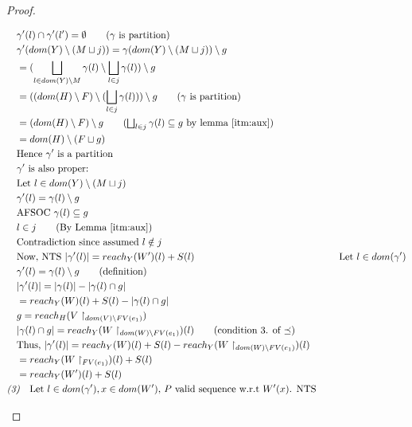 \documentclass[11pt]{article}
\theoremstyle{definition}
\begin{document}
\begin{proof}
\begin{description}
\begin{align*}
		&\quad \gamma'(l) \cap \gamma'(l') = \emptyset \tag{$\gamma$ is partition}\\
		&\quad \gamma'(dom(Y) \setminus (M \sqcup j)) = \gamma(dom(Y) \setminus (M \sqcup j)) \setminus g\\
		&\quad = (\bigsqcup_{l \in dom(Y) \setminus M} \gamma(l) \setminus \bigsqcup_{l \in j} \gamma(l)) 
			\setminus g\\
		&\quad = ((dom(H) \setminus F) \setminus (\bigsqcup_{l \in j} \gamma(l))) \setminus g 
			\tag{$\gamma$ is partition}\\
		&\quad = (dom(H) \setminus F) \setminus g 
			\tag{$\bigsqcup_{l \in j} \gamma(l) \subseteq g$ by lemma \ref{itm:aux}}\\
		&\quad = dom(H) \setminus (F \sqcup g)\\
		&\quad \text{Hence } \gamma' \text{ is a partition}\\
		&\quad \gamma' \text{ is also proper: }\\
		&\quad \text{Let } l \in dom(Y) \setminus (M \sqcup j)\\
		&\quad \gamma'(l) = \gamma(l) \setminus g\\
		&\quad \text{AFSOC } \gamma(l) \subseteq g\\ 
		&\quad l \in j \tag{By Lemma \ref{itm:aux}}\\
		&\quad \text{Contradiction since assumed } l \notin j\\ 
		&\quad \text{Now, NTS } |\gamma'(l)| = reach_{Y}(W')(l) + S(l)
		&\quad \text{Let } l \in dom(\gamma')\\
		&\quad \gamma'(l) = \gamma(l) \setminus g \tag{definition}\\ 
		&\quad |\gamma'(l)| = |\gamma(l)| - |\gamma(l) \cap g|\\
		&\quad = reach_Y(W)(l) + S(l) - |\gamma(l) \cap g|\\
		&\quad g = reach_H(V\restriction_{dom(V) \setminus FV(e_1)})\\
		&\quad |\gamma(l) \cap g| = reach_Y(W\restriction_{dom(W)\setminus FV(e_1)})(l) 
			\tag{condition 3. of $\preceq$}\\
		&\quad \text{Thus, } |\gamma'(l)| = 
			reach_Y(W)(l) + S(l) - reach_Y(W\restriction_{dom(W)\setminus FV(e_1)})(l)\\
		&\quad = reach_Y(W\restriction_{FV(e_1)})(l) +  S(l)\\
		&\quad = reach_Y(W')(l) +  S(l)\\
		&\emph{(3)}\quad \text{Let $l \in dom(\gamma'), x \in dom(W')$, 
			$P$ valid sequence w.r.t $W'(x)$. NTS }\\ 

\end{align*}
\end{description}
\end{proof}
\end{document}
